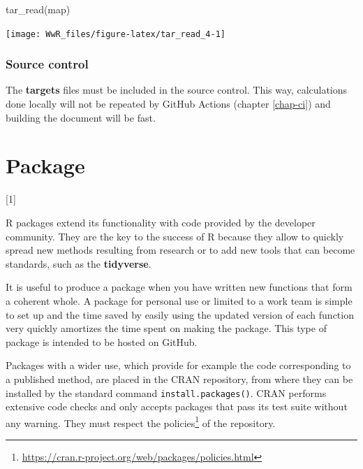 \documentclass[
  12pt,
  american,
  a4paper,
  extrafontsizes,onecolumn,openright
  ]{memoir}
\newenvironment{Shaded}{\begin{snugshade}}{\end{snugshade}}
\newcommand{\FunctionTok}[1]{\textcolor[rgb]{0.00,0.00,0.00}{#1}}
\newcommand{\NormalTok}[1]{#1}
\newlength{\rf}
\newcommand{\toc}[1]{%
  \startcontents[chapters]%
  \printcontents[chapters]{}{1}[#1]{}%
  ~\newline%
}
\begin{document}
\scriptsize

\begin{Shaded}
\begin{Highlighting}[]
\FunctionTok{tar\_read}\NormalTok{(map)}
\end{Highlighting}
\end{Shaded}

\begin{center}\texttt{[image: WwR\_files/figure-latex/tar\_read\_4-1]} \end{center}

\normalsize

\hypertarget{source-control-1}{%
\subsection{Source control}\label{source-control-1}}

The \textbf{targets} files must be included in the source control.
This way, calculations done locally will not be repeated by GitHub Actions (chapter \ref{chap-ci}) and building the document will be fast.

\hypertarget{chap-package}{%
\chapter{Package}\label{chap-package}}

\toc{1}

R packages extend its functionality with code provided by the developer community.
They are the key to the success of R because they allow to quickly spread new methods resulting from research or to add new tools that can become standards, such as the \textbf{tidyverse}.

It is useful to produce a package when you have written new functions that form a coherent whole.
A package for personal use or limited to a work team is simple to set up and the time saved by easily using the updated version of each function very quickly amortizes the time spent on making the package.
This type of package is intended to be hosted on GitHub.

Packages with a wider use, which provide for example the code corresponding to a published method, are placed in the CRAN repository, from where they can be installed by the standard command \texttt{install.packages()}.
CRAN performs extensive code checks and only accepts packages that pass its test suite without any warning.
They must respect the policies\footnote{\url{https://cran.r-project.org/web/packages/policies.html}} of the repository.
\end{document}
